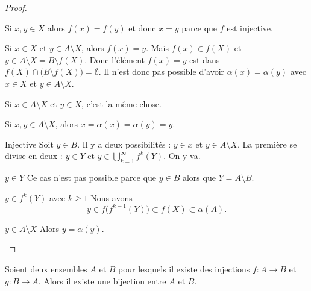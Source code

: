 \begin{proof}
\begin{subproof}
            Si \( x,y\in X\) alors \( f(x)=f(y)\) et donc \( x=y\) parce que \( f\) est injective.

            Si \( x\in X\) et \( y\in A\setminus X\), alors \( f(x)=y\). Mais \( f(x)\in f(X)\) et \( y\in A\setminus X=B\setminus f(X)\). Donc l'élément \( f(x)=y\) est dans \( f(X)\cap \big( B\setminus f(X) \big)=\emptyset\). Il n'est donc pas possible d'avoir \( \alpha(x)=\alpha(y)\) avec \( x\in X\) et \( y\in A\setminus X\).

            Si \( x\in A\setminus X\) et \( y\in X\), c'est la même chose.

            Si \( x,y\in A\setminus X\), alors \( x=\alpha(x)=\alpha(y)=y\).

        \item[Injective]
            Soit \( y\in B\). Il y a deux possibilités : \( y\in x\) et \( y\in A\setminus X\). La première se divise en deux : \( y\in Y\) et \( y\in \bigcup_{k=1}^{\infty}f^k(Y)\). On y va.

            \begin{subproof}
                \item[\( y\in Y\)]
                    Ce cas n'est pas possible parce que \( y\in B\) alors que \( Y=A\setminus B\).
                \item[\( y\in f^k(Y)\) avec \( k\geq 1\)]
                    Nous avons
                    \begin{equation}
                         y\in f\big( f^{k-1}(Y) \big)\subset f(X)\subset \alpha(A).
                    \end{equation}
                \item[\( y\in A\setminus X\)]
                    Alors \( y=\alpha(y)\).
            \end{subproof}
    \end{subproof}
\end{proof}

\begin{theorem}      \label{THOooRYZJooQcjlcl}
    Soient deux ensembles \( A\) et \( B\) pour lesquels il existe des injections \( f\colon A\to B\) et \( g\colon B\to A\). Alors il existe une bijection entre \( A\) et \( B\).
\end{theorem}

